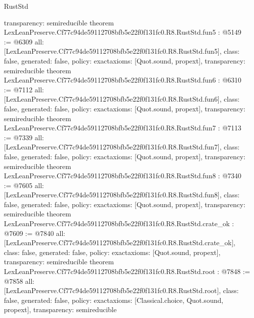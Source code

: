 \begin{lexlean}{RustStd}
\begin{coremodule}
{  transparency: semireducible
}
theorem LexLeanPreserve.Cf77c94de59112708bfb5e22f0f131fc0.R8.RustStd.fun5 : @5149 := @6309 {
  all: [LexLeanPreserve.Cf77c94de59112708bfb5e22f0f131fc0.R8.RustStd.fun5],
  class: false,
  generated: false,
  policy: exact{axioms: [Quot.sound, propext]},
  transparency: semireducible
}
theorem LexLeanPreserve.Cf77c94de59112708bfb5e22f0f131fc0.R8.RustStd.fun6 : @6310 := @7112 {
  all: [LexLeanPreserve.Cf77c94de59112708bfb5e22f0f131fc0.R8.RustStd.fun6],
  class: false,
  generated: false,
  policy: exact{axioms: [Quot.sound, propext]},
  transparency: semireducible
}
theorem LexLeanPreserve.Cf77c94de59112708bfb5e22f0f131fc0.R8.RustStd.fun7 : @7113 := @7339 {
  all: [LexLeanPreserve.Cf77c94de59112708bfb5e22f0f131fc0.R8.RustStd.fun7],
  class: false,
  generated: false,
  policy: exact{axioms: [Quot.sound, propext]},
  transparency: semireducible
}
theorem LexLeanPreserve.Cf77c94de59112708bfb5e22f0f131fc0.R8.RustStd.fun8 : @7340 := @7605 {
  all: [LexLeanPreserve.Cf77c94de59112708bfb5e22f0f131fc0.R8.RustStd.fun8],
  class: false,
  generated: false,
  policy: exact{axioms: [Quot.sound, propext]},
  transparency: semireducible
}
theorem LexLeanPreserve.Cf77c94de59112708bfb5e22f0f131fc0.R8.RustStd.crate_ok : @7609 := @7840 {
  all: [LexLeanPreserve.Cf77c94de59112708bfb5e22f0f131fc0.R8.RustStd.crate_ok],
  class: false,
  generated: false,
  policy: exact{axioms: [Quot.sound, propext]},
  transparency: semireducible
}
theorem LexLeanPreserve.Cf77c94de59112708bfb5e22f0f131fc0.R8.RustStd.root : @7848 := @7858 {
  all: [LexLeanPreserve.Cf77c94de59112708bfb5e22f0f131fc0.R8.RustStd.root],
  class: false,
  generated: false,
  policy: exact{axioms: [Classical.choice, Quot.sound, propext]},
  transparency: semireducible
}


\end{coremodule}
\end{lexlean}
